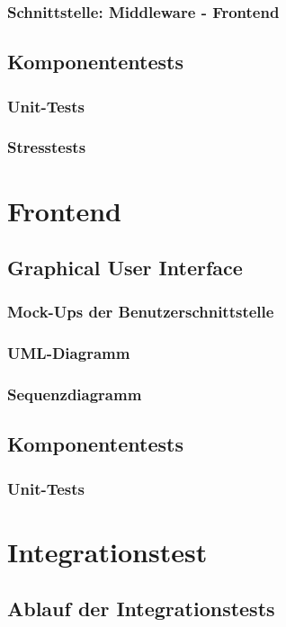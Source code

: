 \documentclass{scrartcl}
\begin{document}
\subsubsection{Schnittstelle: Middleware - Frontend}
\subsection{Komponententests}
\subsubsection{Unit-Tests}
\subsubsection{Stresstests}
\newpage

\section{Frontend}
\subsection{Graphical User Interface}
\subsubsection{Mock-Ups der Benutzerschnittstelle}
\subsubsection{UML-Diagramm}
\subsubsection{Sequenzdiagramm}
\subsection{Komponententests}
\subsubsection{Unit-Tests}
\newpage

\section{Integrationstest}
\subsection{Ablauf der Integrationstests}
\end{document}
